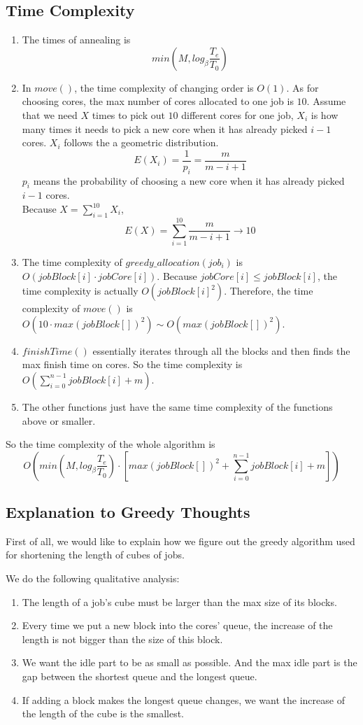 \documentclass{llncs}
\begin{document}
	\subsection{Time Complexity} \label{subsec-time}
	\begin{enumerate}
		\item The times of annealing is 
		\[
			min(M, log_\beta \frac{T_e}{T_0})
		\]
		\item In $move()$, the time complexity of changing order is $O(1)$. As for choosing cores, the max number of cores allocated to one job is $10$. Assume that we need $X$ times to pick out $10$ different cores for one job, $X_i$ is how many times it needs to pick a new core when it has already picked $i-1$ cores. $X_i$ follows the a geometric distribution. 
		\[E(X_i) = \frac{1}{p_i} = \frac{m}{m-i+1}
		\]
		$p_i$ means the probability of choosing a new core when it has already picked $i-1$ cores. \\
		Because $X = \sum_{i = 1}^{10} X_i$, 
		\[E(X) = \sum_{i = 1}^{10} \frac{m}{m-i+1} \rightarrow 10
		\]
		\item The time complexity of $greedy\_allocation(job_i)$ is $O(jobBlock[i]\cdot jobCore[i])$. Because $jobCore[i] \leq jobBlock[i]$, the time complexity is actually $O(jobBlock[i]^2)$. Therefore, the time complexity of $move()$ is $O(10 \cdot max(jobBlock[])^2) \sim O(max(jobBlock[])^2)$. 
		\item $finishTime()$ essentially iterates through all the blocks and then finds the max finish time on cores. So the time complexity is $O(\sum_{i = 0}^{n-1} jobBlock[i] + m)$. 
		\item The other functions just have the same time complexity of the functions above or smaller.
	\end{enumerate}
	So the time complexity of the whole algorithm is
	\[O(min(M, log_\beta \frac{T_e}{T_0})\cdot [max(jobBlock[])^2 + \sum_{i = 0}^{n-1} jobBlock[i] + m])
	\]

	\subsection{Explanation to Greedy Thoughts} \label{subsec-exptogreedy}
	First of all, we would like to explain how we figure out the greedy algorithm used for shortening the length of cubes of jobs. 
	
	We do the following qualitative analysis:
	\begin{enumerate}
		\item The length of a job's cube must be larger than the max size of its blocks.
		\item Every time we put a new block into the cores' queue, the increase of the length is not bigger than the size of this block. 
		\item We want the idle part to be as small as possible. And the max idle part is the gap between the shortest queue and the longest queue.
		\item If adding a block makes the longest queue changes, we want the increase of the length of the cube is the smallest.  
	\end{enumerate}
\end{document}
